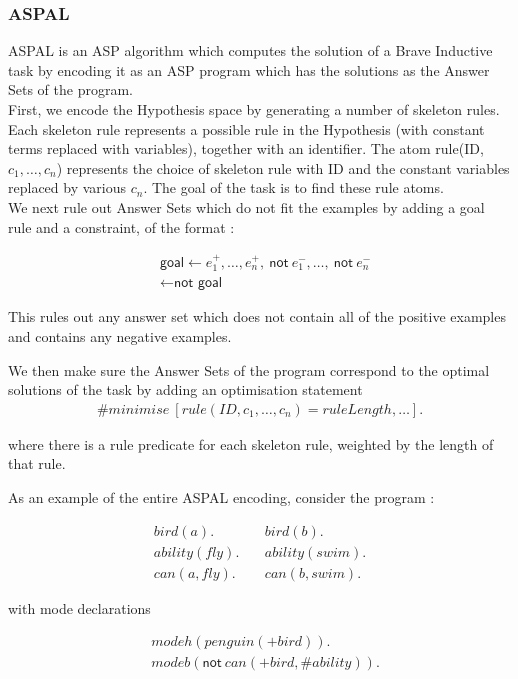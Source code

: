 \subsubsection{ASPAL}

ASPAL is an ASP algorithm which computes the solution of a Brave Inductive task by encoding it as an ASP program which has the solutions as the Answer Sets of the program.\\

First, we encode the Hypothesis space by generating a number of skeleton rules. Each skeleton rule represents a possible rule in the Hypothesis (with constant terms replaced with variables), together with an identifier. The atom rule(ID, $c_1, \dots, c_n$) represents the choice of skeleton rule with ID and the constant variables replaced by various $c_n$. The goal of the task is to find these rule atoms.\\

We next rule out Answer Sets which do not fit the examples by adding a goal rule and a constraint, of the format :

\begin{align*}
&\textsf{goal} \gets e_1^+, \dots, e_n^+, \: \textsf{not} \: e_1^-, \dots, \: \textsf{not} \: e_n^- \\
&\gets \textsf{not goal}
\end{align*}

This rules out any answer set which does not contain all of the positive examples and contains any negative examples.

We then make sure the Answer Sets of the program correspond to the optimal solutions of the task by adding an optimisation statement
\begin{align*}
\# minimise \: [rule(ID, c_1, \dots, c_n) = ruleLength, \dots].
\end{align*}

where there is a rule predicate for each skeleton rule, weighted by the length of that rule.

As an example of the entire ASPAL encoding, consider the program :

\begin{align*}
bird(a).& \: &bird(b).\\
ability(fly).& \: &ability(swim). \\
can(a, fly).& \: &can(b, swim).
\end{align*}

with mode declarations 

\begin{align*}
&modeh(penguin(+bird)).\\
&modeb(\textsf{not} \: can(+bird, \#ability)).
\end{align*}

